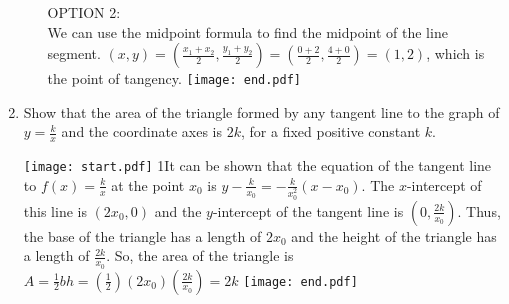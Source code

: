 \documentclass[12pt]{article}
\begin{document}
\begin{enumerate}
\begin{enumerate}
{{{OPTION 2:\\
We can use the midpoint formula to find the midpoint of the line segment. $(x,y)=\left(\frac{x_1+x_2}{2},\frac{y_1+y_2}{2}\right)=\left(\frac{0+2}{2},\frac{4+0}{2}\right)=(1,2)$, which is the point of tangency.}}}
\texttt{[image: end.pdf]}


\end{enumerate}

\item Show that the area of the triangle formed by any tangent line to the graph of $\displaystyle y=\frac{k}{x}$ and the coordinate axes is $2k$, for a fixed positive constant $k$.

\texttt{[image: start.pdf]}
{{{1\linewidth}{It can be shown that the equation of the tangent line to $\displaystyle f(x)=\frac{k}{x}$ at the point $x_0$ is $\displaystyle y-\frac{k}{x_0}=-\frac{k}{x_0^2}(x-x_0)$.  The $x$-intercept of this line is $\displaystyle \left(2x_0,0 \right)$ and the $y$-intercept of the tangent line is $\displaystyle \left(0,\frac{2k}{x_0}\right)$.  Thus, the base of the triangle has a length of $2x_0$ and the height of the triangle has a length of $\displaystyle \frac{2k}{x_0}$.  So, the area of the triangle is $\displaystyle A=\frac{1}{2}bh=\left(\frac{1}{2}\right) \left(2x_0\right) \left(\frac{2k}{x_0}\right)=2k$}}}
\texttt{[image: end.pdf]}


\end{enumerate}
\end{document}
